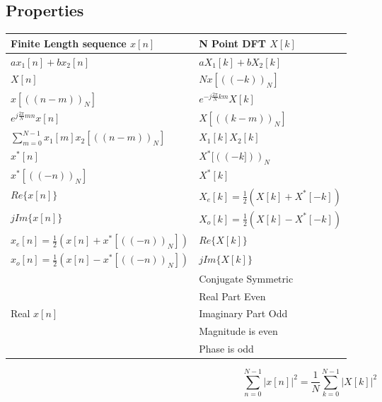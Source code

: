 \documentclass{article}
\begin{document}
\subsection*{Properties}
\begin{center}
    \begin{tabularx}{\textwidth}{XX}
        \hline
        Finite Length sequence $x[n]$ & N Point DFT $X[k]$\\
        \hline
        $ax_1[n] + bx_2[n]$ & $aX_1[k]+bX_2[k]$\\
        $X[n]$ & $Nx[((-k))_N]$\\
        $x[((n-m))_N]$ & $e^{-j\frac{2\pi}{N}km}X[k]$\\
        $e^{j\frac{2\pi}{N}mn}x[n]$ & $X[((k-m))_N]$\\
        $\sum_{m=0}^{N-1}{x_1[m]x_2[((n-m))_N]}$ & $X_1[k]X_2[k]$\\
        $x^*[n]$ & $X^*[((-k]))_N$\\
        $x^*[((-n))_N]$ & $X^*[k]$\\
        $Re\{x[n]\}$ & $X_e[k] = \frac{1}{2}\left(X[k]+X^*[-k]\right)$\\
        $jIm\{x[n]\}$ & $X_o[k] = \frac{1}{2}\left(X[k]-X^*[-k]\right)$\\
        $x_e[n] = \frac{1}{2}\left(x[n]+x^*[((-n))_N]\right)$ & $Re\{X[k]\}$\\
        $x_o[n] = \frac{1}{2}\left(x[n]-x^*[((-n))_N]\right)$ & $jIm\{X[k]\}$\\
        \hline
        & Conjugate Symmetric\\
        & Real Part Even\\
        Real $x[n]$ & Imaginary Part Odd\\
        & Magnitude is even\\
        & Phase is odd
    \end{tabularx}
\end{center}
$$\sum_{n=0}^{N-1}|x[n]|^2 = \frac{1}{N}\sum_{k=0}^{N-1}|X[k]|^2$$
\end{document}
